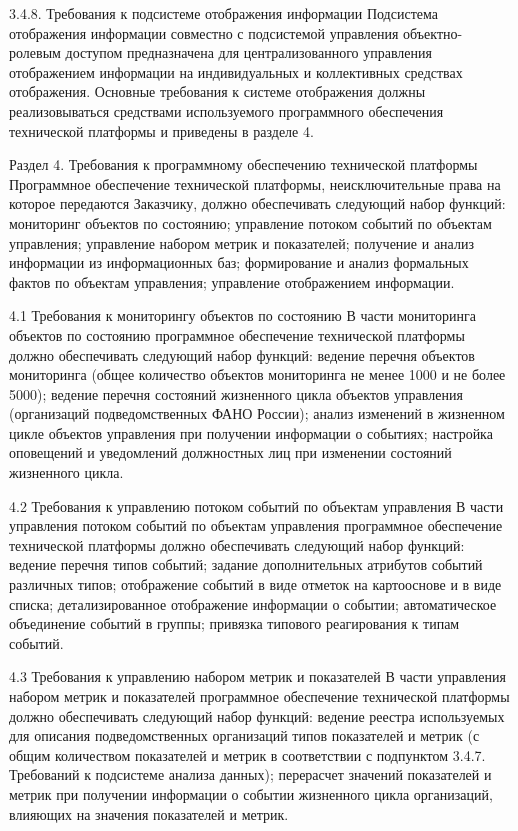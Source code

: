 3.4.8. Требования к подсистеме отображения информации
Подсистема отображения информации совместно с подсистемой управления объектно-ролевым доступом предназначена для централизованного управления отображением информации на индивидуальных и коллективных средствах отображения.
Основные требования к системе отображения должны реализовываться средствами используемого программного обеспечения технической платформы и  приведены в разделе 4.

Раздел 4. Требования к программному обеспечению технической платформы 
Программное обеспечение технической  платформы, неисключительные права на которое передаются Заказчику, должно обеспечивать следующий набор функций:
мониторинг объектов по состоянию;
управление потоком событий по объектам управления;
управление набором метрик и показателей;
получение и анализ информации из информационных баз;
формирование и анализ формальных фактов по  объектам управления;
управление отображением информации. 

4.1 Требования к мониторингу объектов по состоянию
В части мониторинга объектов по состоянию программное обеспечение технической  платформы  должно обеспечивать следующий набор функций:
ведение перечня объектов мониторинга (общее количество объектов мониторинга  не менее 1000 и не более 5000);
ведение перечня состояний жизненного цикла объектов управления (организаций подведомственных ФАНО России);
анализ изменений в жизненном цикле объектов управления при получении информации о событиях;
настройка оповещений и уведомлений должностных лиц при изменении состояний жизненного цикла.

4.2 Требования к управлению потоком событий по объектам управления
В части управления потоком событий по объектам управления программное обеспечение технической  платформы  должно обеспечивать следующий набор функций:
ведение перечня типов событий;
задание дополнительных атрибутов событий различных типов;
отображение событий в виде отметок на картооснове и в виде списка;
детализированное отображение информации о событии;
автоматическое объединение событий в группы;
привязка типового реагирования к типам событий.

4.3 Требования к управлению набором метрик и показателей
В части управления набором метрик и показателей программное обеспечение технической  платформы  должно обеспечивать следующий набор функций:
ведение реестра используемых для описания подведомственных организаций типов показателей и метрик (с общим количеством показателей и метрик в соответствии с  подпунктом 3.4.7. Требований к подсистеме анализа данных);
перерасчет значений показателей и метрик при получении информации о событии жизненного цикла организаций, влияющих на значения показателей и метрик.

